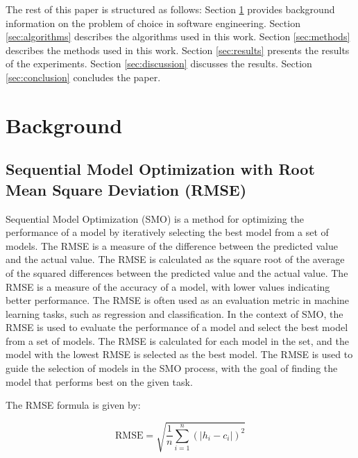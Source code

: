 \documentclass{ieeeaccess}
\begin{document}
The rest of this paper is structured as follows: Section \ref{sec:background} provides background information on the problem of choice in software engineering. Section \ref{sec:algorithms} describes the algorithms used in this work. Section \ref{sec:methods} describes the methods used in this work. Section \ref{sec:results} presents the results of the experiments. Section \ref{sec:discussion} discusses the results. Section \ref{sec:conclusion} concludes the paper.

\section{Background}
\label{sec:background}
\subsection{Sequential Model Optimization with Root Mean Square Deviation (RMSE)}
Sequential Model Optimization (SMO) is a method for optimizing the performance of a model by iteratively selecting the best model from a set of models. The RMSE is a measure of the difference between the predicted value and the actual value. The RMSE is calculated as the square root of the average of the squared differences between the predicted value and the actual value. The RMSE is a measure of the accuracy of a model, with lower values indicating better performance. The RMSE is often used as an evaluation metric in machine learning tasks, such as regression and classification. In the context of SMO, the RMSE is used to evaluate the performance of a model and select the best model from a set of models. The RMSE is calculated for each model in the set, and the model with the lowest RMSE is selected as the best model. The RMSE is used to guide the selection of models in the SMO process, with the goal of finding the model that performs best on the given task.

The RMSE formula is given by:

\begin{equation}
    \text{RMSE} = \sqrt{\frac{1}{n} \sum_{i=1}^n ( \lvert h_i - c_i \rvert)^2}
\end{equation}
\end{document}
